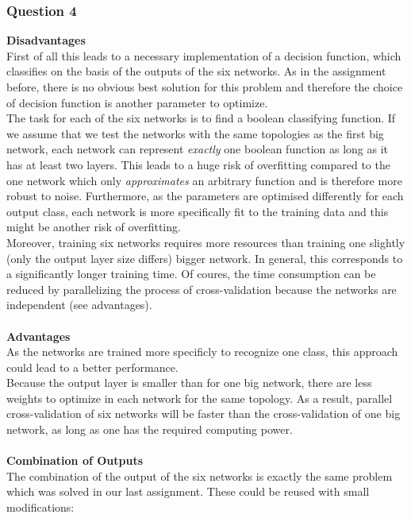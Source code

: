 \documentclass{article}
\begin{document}
\subsubsection{Question 4}
\textbf{Disadvantages} \\
First of all this leads to a necessary implementation of a decision function, which classifies on the basis of the outputs of the six networks. As in the assignment before, there is no obvious best solution for this problem and therefore the choice of decision function is another parameter to optimize.\\
The task for each of the six networks is to find a boolean classifying function. If we assume that we test the networks with the same topologies as the first big network, each network can represent \textit{exactly} one boolean function as long as it has at least two layers. This leads to a huge risk of overfitting compared to the one network which only \textit{approximates} an arbitrary function and is therefore more robust to noise. Furthermore, as the parameters are optimised differently for each output class, each network is more specifically fit to the training data and this might be another risk of overfitting.\\
Moreover, training six networks requires more resources than training one slightly (only the output layer size differs) bigger network. In general, this corresponds to a significantly longer training time. Of coures, the time consumption can be reduced by parallelizing the process of cross-validation because the networks are independent (see advantages).\\
\\
\textbf{Advantages} \\
As the networks are trained more specificly to recognize one class, this approach could lead to a better performance.\\
Because the output layer is smaller than for one big network, there are less weights to optimize in each network for the same topology. As a result, parallel cross-validation of six networks will be faster than the cross-validation of one big network, as long as one has the required computing power.\\
\\
\textbf{Combination of Outputs} \\
The combination of the output of the six networks is exactly the same problem which was solved in our last assignment. These could be reused with small modifications: 
\end{document}
